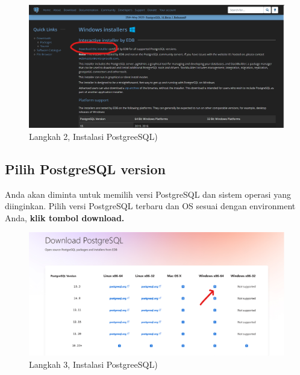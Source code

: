 \documentclass[
]{book}
\begin{document}
\begin{figure}

{\centering \includegraphics[width=1\linewidth]{./images/Bab1/Postgree1} 

}

\caption{Langkah 2, Instalasi PostgreeSQL)}\label{fig:install-posrgree2}
\end{figure}

\hypertarget{pilih-postgresql-version}{%
\subsection{Pilih PostgreSQL version}\label{pilih-postgresql-version}}

Anda akan diminta untuk memilih versi PostgreSQL dan sistem operasi yang diinginkan. Pilih versi PostgreSQL terbaru dan OS sesuai dengan environment Anda, \textbf{klik tombol download.}

\begin{figure}

{\centering \includegraphics[width=1\linewidth]{./images/Bab1/Postgree2} 

}

\caption{Langkah 3, Instalasi PostgreeSQL)}\label{fig:install-posrgree3}
\end{figure}
\end{document}
